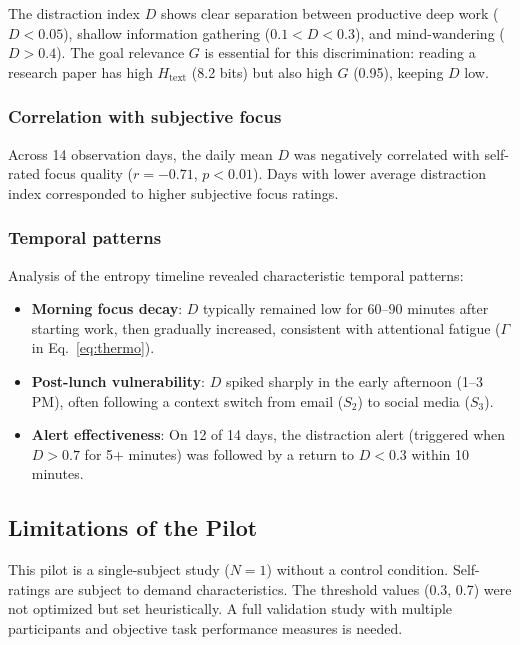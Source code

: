 \documentclass[10pt,letterpaper]{article}
\begin{document}
The distraction index $D$ shows clear separation between productive deep work ($D < 0.05$), shallow information gathering ($0.1 < D < 0.3$), and mind-wandering ($D > 0.4$). The goal relevance $G$ is essential for this discrimination: reading a research paper has high $H_{\text{text}}$ (8.2 bits) but also high $G$ (0.95), keeping $D$ low.

\subsubsection{Correlation with subjective focus}

Across 14 observation days, the daily mean $D$ was negatively correlated with self-rated focus quality ($r = -0.71$, $p < 0.01$). Days with lower average distraction index corresponded to higher subjective focus ratings.

\subsubsection{Temporal patterns}

Analysis of the entropy timeline revealed characteristic temporal patterns:

\begin{itemize}[noitemsep]
    \item \textbf{Morning focus decay}: $D$ typically remained low for 60--90 minutes after starting work, then gradually increased, consistent with attentional fatigue ($\Gamma$ in Eq.~\ref{eq:thermo}).
    \item \textbf{Post-lunch vulnerability}: $D$ spiked sharply in the early afternoon (1--3\,PM), often following a context switch from email ($S_2$) to social media ($S_3$).
    \item \textbf{Alert effectiveness}: On 12 of 14 days, the distraction alert (triggered when $D > 0.7$ for 5+ minutes) was followed by a return to $D < 0.3$ within 10 minutes.
\end{itemize}

\subsection{Limitations of the Pilot}

This pilot is a single-subject study ($N = 1$) without a control condition. Self-ratings are subject to demand characteristics. The threshold values (0.3, 0.7) were not optimized but set heuristically. A full validation study with multiple participants and objective task performance measures is needed.
\end{document}
